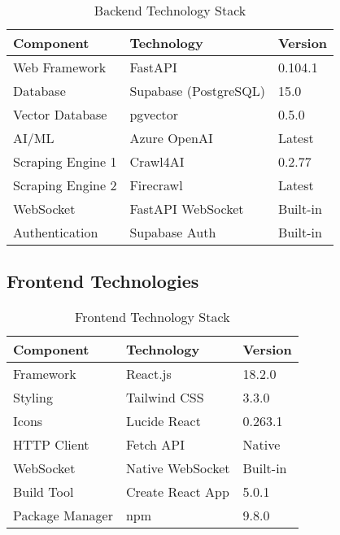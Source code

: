 \documentclass[12pt,a4paper]{report}
\begin{document}
\begin{table}[H]
    \centering
    \caption{Backend Technology Stack}
    \label{tab:backend-tech}
    \begin{tabular}{|l|l|l|}
        \hline
        \rowcolor{primaryblue!20}
        \textbf{Component} & \textbf{Technology} & \textbf{Version} \\
        \hline
        Web Framework & FastAPI & 0.104.1 \\
        \hline
        Database & Supabase (PostgreSQL) & 15.0 \\
        \hline
        Vector Database & pgvector & 0.5.0 \\
        \hline
        AI/ML & Azure OpenAI & Latest \\
        \hline
        Scraping Engine 1 & Crawl4AI & 0.2.77 \\
        \hline
        Scraping Engine 2 & Firecrawl & Latest \\
        \hline
        WebSocket & FastAPI WebSocket & Built-in \\
        \hline
        Authentication & Supabase Auth & Built-in \\
        \hline
    \end{tabular}
\end{table}

\subsection{Frontend Technologies}

\begin{table}[H]
    \centering
    \caption{Frontend Technology Stack}
    \label{tab:frontend-tech}
    \begin{tabular}{|l|l|l|}
        \hline
        \rowcolor{secondarygreen!20}
        \textbf{Component} & \textbf{Technology} & \textbf{Version} \\
        \hline
        Framework & React.js & 18.2.0 \\
        \hline
        Styling & Tailwind CSS & 3.3.0 \\
        \hline
        Icons & Lucide React & 0.263.1 \\
        \hline
        HTTP Client & Fetch API & Native \\
        \hline
        WebSocket & Native WebSocket & Built-in \\
        \hline
        Build Tool & Create React App & 5.0.1 \\
        \hline
        Package Manager & npm & 9.8.0 \\
        \hline
    \end{tabular}
\end{table}
\end{document}
